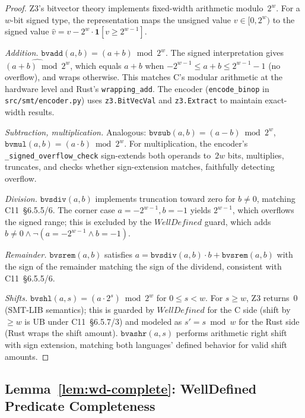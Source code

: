 \documentclass[10pt,a4paper]{article}
\begin{document}
\begin{appendices}
\begin{proof}
Z3's bitvector theory implements fixed-width arithmetic modulo~$2^w$.
For a $w$-bit signed type, the representation maps the unsigned value
$v \in [0, 2^w)$ to the signed value
$\hat{v} = v - 2^w \cdot \mathbf{1}[v \geq 2^{w-1}]$.

\emph{Addition.}
$\texttt{bvadd}(a, b) = (a + b) \bmod 2^w$.
The signed interpretation gives
$\widehat{(a + b) \bmod 2^w}$, which equals $a + b$ when
$-2^{w-1} \leq a + b \leq 2^{w-1}-1$ (no overflow), and wraps
otherwise.  This matches C's modular arithmetic at the hardware level
and Rust's \texttt{wrapping\_add}.  The encoder
(\texttt{encode\_binop} in \texttt{src/smt/encoder.py}) uses
\texttt{z3.BitVecVal} and \texttt{z3.Extract} to maintain
exact-width results.

\emph{Subtraction, multiplication.}
Analogous: $\texttt{bvsub}(a,b) = (a - b) \bmod 2^w$,
$\texttt{bvmul}(a,b) = (a \cdot b) \bmod 2^w$.  For multiplication,
the encoder's \texttt{\_signed\_overflow\_check} sign-extends both
operands to~$2w$ bits, multiplies, truncates, and checks whether
sign-extension matches, faithfully detecting overflow.

\emph{Division.}
$\texttt{bvsdiv}(a, b)$ implements truncation toward zero for
$b \neq 0$, matching C11~\S6.5.5/6.  The corner case
$a = -2^{w-1}, b = -1$ yields $2^{w-1}$, which overflows the signed
range; this is excluded by the $\mathit{WellDefined}$ guard, which
adds $b \neq 0 \wedge \neg(a = -2^{w-1} \wedge b = -1)$.

\emph{Remainder.}
$\texttt{bvsrem}(a, b)$ satisfies
$a = \texttt{bvsdiv}(a,b) \cdot b + \texttt{bvsrem}(a,b)$ with the
sign of the remainder matching the sign of the dividend, consistent
with C11~\S6.5.5/6.

\emph{Shifts.}
$\texttt{bvshl}(a, s) = (a \cdot 2^s) \bmod 2^w$ for
$0 \leq s < w$.  For $s \geq w$, Z3 returns~0 (SMT-LIB semantics);
this is guarded by $\mathit{WellDefined}$ for the C side (shift by
$\geq w$ is UB under C11~\S6.5.7/3) and modeled as
$s' = s \bmod w$ for the Rust side (Rust wraps the shift amount).
$\texttt{bvashr}(a, s)$ performs arithmetic right shift with sign
extension, matching both languages' defined behavior for valid shift
amounts.
\end{proof}

\subsection{Lemma~\ref{lem:wd-complete}: WellDefined Predicate
Completeness}


\end{appendices}
\end{document}
